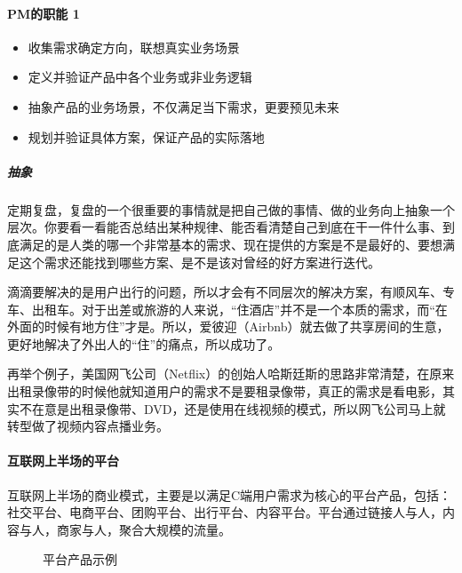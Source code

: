 \documentclass[letterpaper,10pt,english]{sphinxmanual}
\begin{document}
\paragraph{PM的职能 1\sphinxfootnotemark[128]}
\label{\detokenize{chapter_introduction/platform:pm-1}}%
\begin{footnotetext}[128]\sphinxAtStartFootnote
{}
%
\end{footnotetext}\ignorespaces \begin{itemize}
\item {} 
收集需求确定方向，联想真实业务场景

\item {} 
定义并验证产品中各个业务或非业务逻辑

\item {} 
抽象产品的业务场景，不仅满足当下需求，更要预见未来

\item {} 
规划并验证具体方案，保证产品的实际落地

\end{itemize}


\subparagraph{抽象}
\label{\detokenize{chapter_introduction/platform:id2}}
定期复盘，复盘的一个很重要的事情就是把自己做的事情、做的业务向上抽象一个层次。你要看一看能否总结出某种规律、能否看清楚自己到底在干一件什么事、到底满足的是人类的哪一个非常基本的需求、现在提供的方案是不是最好的、要想满足这个需求还能找到哪些方案、是不是该对曾经的好方案进行迭代。

滴滴要解决的是用户出行的问题，所以才会有不同层次的解决方案，有顺风车、专车、出租车。对于出差或旅游的人来说，“住酒店”并不是一个本质的需求，而“在外面的时候有地方住”才是。所以，爱彼迎（Airbnb）就去做了共享房间的生意，更好地解决了外出人的“住”的痛点，所以成功了。

再举个例子，美国网飞公司（Netflix）的创始人哈斯廷斯的思路非常清楚，在原来出租录像带的时候他就知道用户的需求不是要租录像带，真正的需求是看电影，其实不在意是出租录像带、DVD，还是使用在线视频的模式，所以网飞公司马上就转型做了视频内容点播业务。


\paragraph{互联网上半场的平台}
\label{\detokenize{chapter_introduction/platform:id3}}
互联网上半场的商业模式，主要是以满足C端用户需求为核心的平台产品，包括：社交平台、电商平台、团购平台、出行平台、内容平台。平台通过链接人与人，内容与人，商家与人，聚合大规模的流量。

\begin{figure}[H]
\centering
\capstart

\noindent{}
\caption{平台产品示例}\label{\detokenize{chapter_introduction/platform:id12}}\end{figure}
\end{document}
